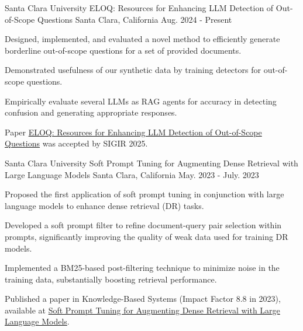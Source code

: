 
\begin{cventries}


  \cventry
    {Santa Clara University} %
    {ELOQ: Resources for Enhancing LLM Detection of Out-of-Scope Questions} %
    {Santa Clara, California} %
    {Aug. 2024 - Present} %
    {
      \begin{cvitems} %
        \item {Designed, implemented, and evaluated a novel method to efficiently generate borderline out-of-scope questions for a set of provided documents.}
        \item {Demonstrated usefulness of our synthetic data by training detectors for out-of-scope questions.}
        \item {Empirically evaluate several LLMs as RAG agents for accuracy in detecting confusion and generating appropriate responses.}
        \item {Paper \href{https://arxiv.org/pdf/2410.14567v3}{\textcolor{awesome-red}{ELOQ: Resources for Enhancing LLM Detection of Out-of-Scope Questions}} was accepted by SIGIR 2025.}
      \end{cvitems}
    }

  \cventry
    {Santa Clara University} %
    {Soft Prompt Tuning for Augmenting Dense Retrieval with Large Language Models} %
    {Santa Clara, California} %
    {May. 2023 - July. 2023} %
    {
      \begin{cvitems} %
        \item {Proposed the first application of soft prompt tuning in conjunction with large language models to enhance dense retrieval (DR) tasks.}
        \item {Developed a soft prompt filter to refine document-query pair selection within prompts, significantly improving the quality of weak data used for training DR models.}
        \item {Implemented a BM25-based post-filtering technique to minimize noise in the training data, substantially boosting retrieval performance.}
        \item {Published a paper in Knowledge-Based Systems (Impact Factor 8.8 in 2023), available at \href{https://www.sciencedirect.com/science/article/pii/S0950705124013923}{\textcolor{awesome-red}{Soft Prompt Tuning for Augmenting Dense Retrieval with Large Language Models}}.}
      \end{cvitems}
    }

\end{cventries}